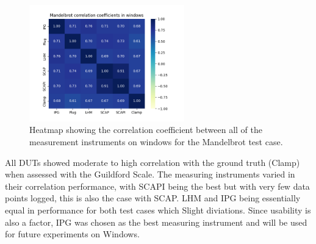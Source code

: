   \begin{figure}[H]
    \centering
    \hspace*{-1cm} %
    \includegraphics[width=0.6\textwidth]{figures/Mandelbrot_ex2.png}
    \caption{Heatmap showing the correlation coefficient between all of the measurement instruments on windows for the Mandelbrot test case.}
    \label{fig:mandelbrotCorr}
  \end{figure}
  

  All DUTs showed moderate to high correlation with the ground truth (Clamp) when assessed with the Guildford Scale. The measuring instruments varied in their correlation performance, with SCAPI being the best but with very few data points logged, this is also the case with SCAP. LHM and IPG being essentially equal in performance for both test cases which Slight diviations. Since usability is also a factor, IPG was chosen as the best measuring instrument and will be used for future experiments on Windows.



